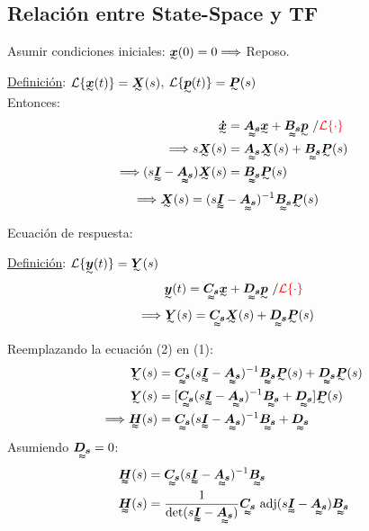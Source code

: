 \subsection{Relación entre State-Space y TF}
Asumir condiciones iniciales: $\tend{x}(0)=0\Longrightarrow$ Reposo.\\
\par \underline{Definición}: $\mathcal{L}\{\tend{x}(t)\}=\tend{X}(s)$, $\mathcal{L}\{\tend{p}(t)\}=\tend{P}(s)$ \\
Entonces: 
\begin{align*}
    \tend{\dot{x}}&=\tenq{A_s}\tend{x}+\tenq{B_s}\tend{p} ~/\color{red}{\mathcal{L}\{\cdot\}}\\
    \Longrightarrow s\tend{X}(s)&= \tenq{A_s}\tend{X}(s)+\tenq{B_s}\tend{P}(s)\\
    \Longrightarrow (s\tenq{I}-\tenq{A_s})\tend{X}(s)&=\tenq{B_s}\tend{P}(s)
\end{align*}
\begin{align}
    \Longrightarrow \tend{X}(s)&=(s\tenq{I}-\tenq{A_s})^{-1}\tenq{B_s}\tend{P}(s)
\end{align}

\par Ecuación de respuesta:
\par \underline{Definición}: $\mathcal{L}\{\tend{y}(t)\}=\tend{Y}(s)$\\
\begin{align*}
    \tend{y}(t)=\tenq{C_s}\tend{x}+\tenq{D_s}\tend{p} ~/\color{red}{\mathcal{L}\{\cdot\}}\\
\end{align*}
\begin{align}
    \Longrightarrow \tend{Y}(s)&=\tenq{C_s}\tend{X}(s)+\tenq{D_s}\tend{P}(s)
\end{align} 

Reemplazando la ecuación (2) en (1):
\begin{align*}
    \tend{Y}(s)&=\tenq{C_s}(s\tenq{I}-\tenq{A_s})^{-1}\tenq{B_s}\tend{P}(s)+\tenq{D_s}\tend{P}(s)\\
    \tend{Y}(s)&=[\tenq{C_s}(s\tenq{I}-\tenq{A_s})^{-1}\tenq{B_s}+\tenq{D_s}]\tend{P}(s)\\
    \Longrightarrow \tenq{H}(s)&=\tenq{C_s}(s\tenq{I}-\tenq{A_s})^{-1}\tenq{B_s}+\tenq{D_s}
\end{align*}
Asumiendo $\tenq{D_s}=0$:
\begin{align*}
\tenq{H}(s)&=\tenq{C_s}(s\tenq{I}-\tenq{A_s})^{-1}\tenq{B_s}\\
\tenq{H}(s)&=\frac{1}{\det(s\tenq{I}-\tenq{A_s})}\tenq{C_s}\text{ adj}(s\tenq{I}-\tenq{A_s})\tenq{B_s}
\end{align*}

